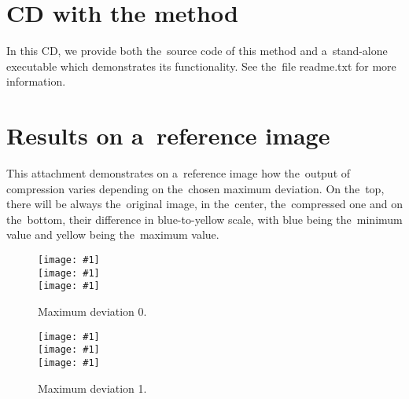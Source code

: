 \appendix

%
%
%
%
%

\openright

\chapter{CD with the method}
\label{att:cd}
In this CD, we provide both the~source code of this method and a~stand-alone executable which demonstrates its functionality. See the~file readme.txt for more information.


\chapter{Results on a~reference image}
\label{att:res_ref}

This attachment demonstrates on a~reference image how the~output of compression varies depending on the~chosen maximum deviation. On the~top, there will be always the~original image, in the~center, the~compressed one and on the~bottom, their difference in blue-to-yellow scale, with blue being the~minimum value and yellow being the~maximum value.

\newcommand{\incref}[1]{\texttt{[image: \#1]}}

\begin{figure}
	\begin{center}
		\incref{figures/out_0.png} \\ 
		\incref{figures/out_0.png} \\ 
		\incref{figures/out_diff_0.png} \\ 
	\end{center}
	\caption{Maximum deviation 0.}
\end{figure}

\begin{figure}
	\begin{center}
		\incref{figures/out_1.png} \\ 
		\incref{figures/out_1.png} \\ 
		\incref{figures/out_diff_1.png} \\ 
	\end{center}
	\caption{Maximum deviation 1.}
\end{figure}

